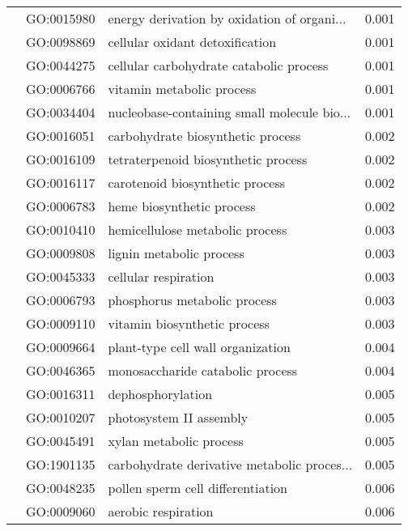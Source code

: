 \begin{longtable}{lllr}
   & GO:0015980 &  energy derivation by oxidation of organi... &         0.001 \\
   & GO:0098869 &              cellular oxidant detoxification &         0.001 \\
   & GO:0044275 &      cellular carbohydrate catabolic process &         0.001 \\
   & GO:0006766 &                    vitamin metabolic process &         0.001 \\
   & GO:0034404 &  nucleobase-containing small molecule bio... &         0.001 \\
   & GO:0016051 &            carbohydrate biosynthetic process &         0.002 \\
   & GO:0016109 &          tetraterpenoid biosynthetic process &         0.002 \\
   & GO:0016117 &              carotenoid biosynthetic process &         0.002 \\
   & GO:0006783 &                    heme biosynthetic process &         0.002 \\
   & GO:0010410 &              hemicellulose metabolic process &         0.003 \\
   & GO:0009808 &                     lignin metabolic process &         0.003 \\
   & GO:0045333 &                         cellular respiration &         0.003 \\
   & GO:0006793 &                 phosphorus metabolic process &         0.003 \\
   & GO:0009110 &                 vitamin biosynthetic process &         0.003 \\
   & GO:0009664 &            plant-type cell wall organization &         0.004 \\
   & GO:0046365 &             monosaccharide catabolic process &         0.004 \\
   & GO:0016311 &                            dephosphorylation &         0.005 \\
   & GO:0010207 &                      photosystem II assembly &         0.005 \\
   & GO:0045491 &                      xylan metabolic process &         0.005 \\
   & GO:1901135 &  carbohydrate derivative metabolic proces... &         0.005 \\
   & GO:0048235 &            pollen sperm cell differentiation &         0.006 \\
   & GO:0009060 &                          aerobic respiration &         0.006 \\

\end{longtable}
